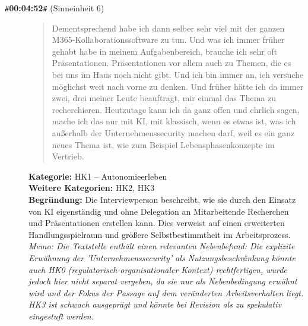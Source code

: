 \begin{description}
  \item[\texttt{\#}\textbf{00:04:52}\texttt{\#} (Sinneinheit 6)]
  \begin{quote}
  Dementsprechend habe ich dann selber sehr viel mit der ganzen M365-Kollaborationssoftware zu tun. Und was ich immer früher gehabt habe in meinem Aufgabenbereich, brauche ich sehr oft Präsentationen. Präsentationen vor allem auch zu Themen, die es bei uns im Haus noch nicht gibt. Und ich bin immer an, ich versuche möglichst weit nach vorne zu denken. Und früher hätte ich da immer zwei, drei meiner Leute beauftragt, mir einmal das Thema zu recherchieren. Heutzutage kann ich da ganz offen und ehrlich sagen, mache ich das nur mit KI, mit klassisch, wenn es etwas ist, was ich außerhalb der Unternehmenssecurity machen darf, weil es ein ganz neues Thema ist, wie zum Beispiel Lebensphasenkonzepte im Vertrieb.
  \end{quote}
  \textbf{Kategorie:} HK1 -- Autonomieerleben\\
  \textbf{Weitere Kategorien:} HK2, HK3\\
  \textbf{Begr\"undung:} Die Interviewperson beschreibt, wie sie durch den Einsatz von KI eigenständig und ohne Delegation an Mitarbeitende Recherchen und Präsentationen erstellen kann. Dies verweist auf einen erweiterten Handlungsspielraum und größere Selbstbestimmtheit im Arbeitsprozess.
  \\\textit{Memo: Die Textstelle enthält einen relevanten Nebenbefund: Die explizite Erwähnung der 'Unternehmenssecurity' als Nutzungsbeschränkung könnte auch HK0 (regulatorisch-organisationaler Kontext) rechtfertigen, wurde jedoch hier nicht separat vergeben, da sie nur als Nebenbedingung erwähnt wird und der Fokus der Passage auf dem veränderten Arbeitsverhalten liegt. HK3 ist schwach ausgeprägt und könnte bei Revision als zu spekulativ eingestuft werden.}
\end{description}
\medskip

